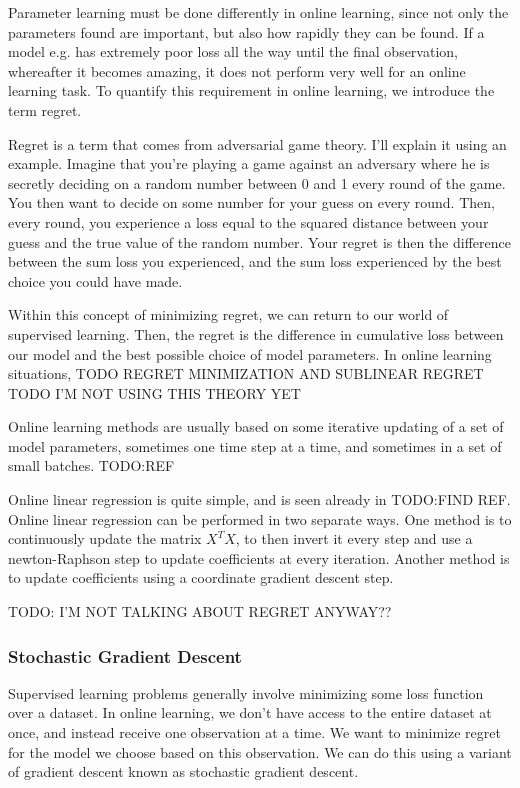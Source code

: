 Parameter learning must be done differently in online learning, since not only
the parameters found are important, but also how rapidly they can be found. If
a model e.g. has extremely poor loss all the way until the final observation,
whereafter it becomes amazing, it does not perform very well for an online
learning task. To quantify this requirement in online learning, we introduce
the term regret.

Regret is a term that comes from adversarial game theory. I'll explain it using
an example. Imagine that you're playing a game against an adversary where he is
secretly deciding on a random number between 0 and 1 every round of the game.
You then want to decide on some number for your guess on every round. Then,
every round, you experience a loss equal to the squared distance between your
guess and the true value of the random number. Your regret is then the
difference between the sum loss you experienced, and the sum loss experienced
by the best choice you could have made.

Within this concept of minimizing regret, we can return to our world of
supervised learning. Then, the regret is the difference in cumulative loss
between our model and the best possible choice of model parameters. In online
learning situations, TODO REGRET MINIMIZATION AND SUBLINEAR REGRET TODO I'M NOT
USING THIS THEORY YET

Online learning methods are usually based on some iterative updating of a set
of model parameters, sometimes one time step at a time, and sometimes in a set
of small batches. TODO:REF

Online linear regression is quite simple, and is seen already in TODO:FIND REF.
Online linear regression can be performed in two separate ways. One method is
to continuously update the matrix $X^TX$, to then invert it every step and use a
newton-Raphson step to update coefficients at every iteration. Another method
is to update coefficients using a coordinate gradient descent step.

TODO: I'M NOT TALKING ABOUT REGRET ANYWAY??

\subsubsection{Stochastic Gradient Descent}

Supervised learning problems generally involve minimizing some loss function
over a dataset. In online learning, we don't have access to the entire dataset
at once, and instead receive one observation at a time. We want to minimize
regret for the model we choose based on this observation. We can do this using
a variant of gradient descent known as stochastic gradient descent.

